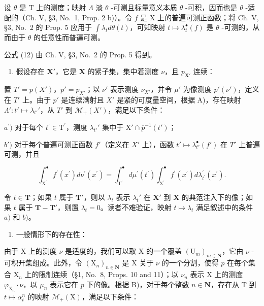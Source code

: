 设 \(\theta\) 是 T 上的测度；映射 \(\Lambda\) 淡 \(\theta\) -可测且标量意义本质 \(\theta\) -可积，因而也是 \(\theta\) -适配的（Ch. V, §3, No.~1, Prop. 2 b)）。令 \(f\) 是 X 上的普遍可测正函数；将 Ch. V, §3, No.~2 的 Prop. 5 应用于 \(\int \lambda_t d\theta(t)\)，可知映射 \(t \mapsto \lambda_t^{\bullet}(f)\) 是 \(\theta\) -可测的，从而由于 \(\theta\) 的任意性而普遍可测。

公式 (12) 由 Ch. V, §3, No.~2 的 Prop. 5 得到。

\begin{enumerate}
\def\labelenumi{\Alph{enumi})}
\setcounter{enumi}{1}
\tightlist
\item
  假设存在 \(\mathbf{X}'\)，它是 \(\mathbf{X}\) 的紧子集，集中着测度 \(\nu\)，且 \(p_{\mathbf{X}'}\) 连续：
\end{enumerate}

置 \(T' = p(X')\)，\(p' = p_{X'}\)；以 \(\nu'\) 表示测度 \(\nu_{X'}\)，并令 \(\mu'\) 为像测度 \(p'(\nu')\)，定义在 \(T'\) 上。由于 \(p'\) 是连续满射且 \(X'\) 是紧的可度量空间，根据 A)，存在映射 \(\Lambda': t' \mapsto \lambda_{t'}'\)，从 \(T'\) 到 \(\mathcal{M}_{+}(X')\)，满足以下条件：

\(a^{\prime})\) 对于每个 \(t^\prime \in \mathrm{T}^\prime\)，测度 \(\lambda_{t'}'\) 集中于 \(\mathrm{X}' \cap \overline{p}^{-1}(t')\)；

\(b')\) 对于每个普遍可测正函数 \(f'\)（定义在 \(X'\) 上），函数 \(t' \mapsto \lambda_{t'}^{\bullet}(f')\) 在 \(T'\) 上普遍可测，并且

\[
\int_ {\mathrm{X} ^ {\prime}} ^ {\bullet} f ^ {\prime} (x ^ {\prime}) d \nu^ {\prime} (x ^ {\prime}) = \int_ {\mathrm{T} ^ {\prime}} ^ {\bullet} d \mu^ {\prime} (t ^ {\prime}) \int_ {\mathrm{X} ^ {\prime}} ^ {\bullet} f ^ {\prime} (x ^ {\prime}) d \lambda_ {t ^ {\prime}} ^ {\prime} (x ^ {\prime}).
\]

令 \(t \in \mathbf{T}\)；如果 \(t\) 属于 \(\mathbf{T}'\)，则以 \(\lambda_t\) 表示 \(\lambda_t'\) 在 \(\mathbf{X}'\) 到 \(\mathbf{X}\) 的典范注入下的像；如果 \(t\) 属于 \(\mathbf{T} - \mathbf{T}'\)，则置 \(\lambda_t = 0\)。读者不难验证，映射 \(t \mapsto \lambda_t\) 满足叙述中的条件 \(a)\) 和 \(b)\)。

\begin{enumerate}
\def\labelenumi{\Alph{enumi})}
\setcounter{enumi}{2}
\tightlist
\item
  一般情形下的存在性：
\end{enumerate}

由于 X 上的测度 \(\nu\) 是适度的，我们可以取 X 的一个覆盖 \((\mathrm{U}_m)_{m\in \mathbf{N}}\)，它由 \(\nu\) -可积开集组成。此外，令 \((\mathrm{X}_n)_{n\in \mathbf{N}}\) 是 X 关于 \(\nu\) 的一个分割，使得 \(p\) 在每个集合 \(\mathrm{X}_n\) 上的限制连续（§1, No.~8, Props. 10 and 11）；以 \(\nu_n\) 表示 X 上的测度 \(\varphi_{\mathrm{X}_n}\cdot \nu\)，以 \(\mu_n\) 表示它在 \(p\) 下的像。根据 B)，对于每个整数 \(n\in \mathbf{N}\)，存在从 T 到 \(t\mapsto \alpha_t^n\) 的映射 \(\mathcal{M}_{+}(\mathrm{X})\)，满足以下条件：

